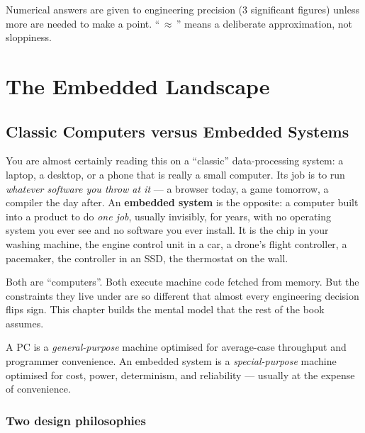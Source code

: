 \documentclass[11pt,a4paper,oneside]{book}
\begin{document}
\vspace{4pt}
Numerical answers are given to engineering precision (3 significant figures)
unless more are needed to make a point. ``\,$\approx$\,'' means a deliberate
approximation, not sloppiness.

\mainmatter

\part{The Embedded Landscape}

\chapter{Classic Computers versus Embedded Systems}
\label{ch:classic-vs-embedded}

You are almost certainly reading this on a ``classic'' data-processing
system: a laptop, a desktop, or a phone that is really a small computer. Its
job is to run \emph{whatever software you throw at it} --- a browser today, a
game tomorrow, a compiler the day after. An \textbf{embedded system} is the
opposite: a computer built into a product to do \emph{one job}, usually
invisibly, for years, with no operating system you ever see and no software
you ever install. It is the chip in your washing machine, the engine control
unit in a car, a drone's flight controller, a pacemaker, the controller in an
SSD, the thermostat on the wall.

Both are ``computers''. Both execute machine code fetched from memory. But the
constraints they live under are so different that almost every engineering
decision flips sign. This chapter builds the mental model that the rest of the
book assumes.

\begin{keyidea}
A PC is a \emph{general-purpose} machine optimised for average-case throughput
and programmer convenience. An embedded system is a \emph{special-purpose}
machine optimised for cost, power, determinism, and reliability --- usually at
the expense of convenience.
\end{keyidea}

\section{Two design philosophies}
\end{document}
